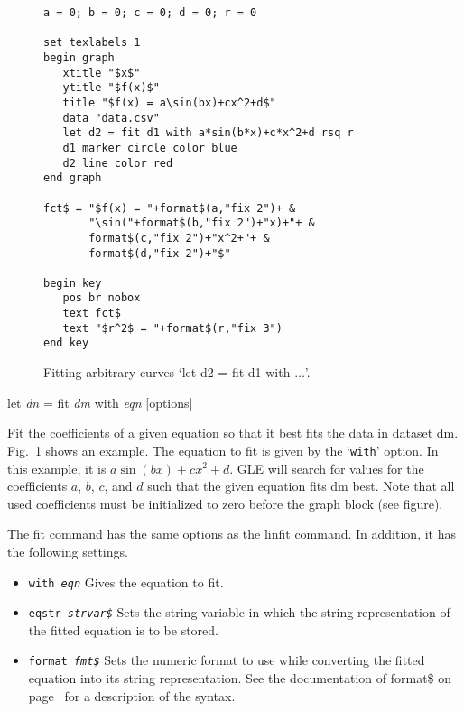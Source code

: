 \begin{commanddescription}
\begin{figure}[tb]
\begin{minipage}[c]{8cm}
\begin{Verbatim}
a = 0; b = 0; c = 0; d = 0; r = 0

set texlabels 1
begin graph
   xtitle "$x$"
   ytitle "$f(x)$"
   title "$f(x) = a\sin(bx)+cx^2+d$"
   data "data.csv"
   let d2 = fit d1 with a*sin(b*x)+c*x^2+d rsq r
   d1 marker circle color blue
   d2 line color red
end graph

fct$ = "$f(x) = "+format$(a,"fix 2")+ &
       "\sin("+format$(b,"fix 2")+"x)+"+ &
       format$(c,"fix 2")+"x^2+"+ &
       format$(d,"fix 2")+"$"

begin key
   pos br nobox
   text fct$
   text "$r^2$ = "+format$(r,"fix 3")
end key
\end{Verbatim}
\end{minipage}
\hfill
\begin{minipage}[c]{7cm}
\mbox{}
\end{minipage}
\caption{\label{fig:fitfct}Fitting arbitrary curves `let d2 = fit d1 with $\ldots$'.}
\end{figure}

\item[{\sf let {\it dn} = fit {\it dm} with {\it eqn} [options]}]

Fit the coefficients of a given equation so that it best fits the data in dataset dm. Fig.~\ref{fig:fitfct} shows an example. The equation to fit is given by the `\texttt{with}' option. In this example, it is $a\sin(bx)+cx^2+d$. GLE will search for values for the coefficients $a$, $b$, $c$, and $d$ such that the given equation fits dm best. Note that all used coefficients must be initialized to zero before the graph block (see figure).

The fit command has the same options as the linfit command. In addition, it has the following settings.

\begin{itemize}
\item \texttt{with {\it eqn}} Gives the equation to fit.

\item \texttt{eqstr {\it strvar\$}} Sets the string variable in which the string representation of the fitted equation is to be stored.

\item \texttt{format {\it fmt\$}} Sets the numeric format to use while converting the fitted equation into its string representation. See the documentation of {\sf format\$} on page~\pageref{formatnum:pg} for a description of the syntax.
\end{itemize}


\end{commanddescription}
